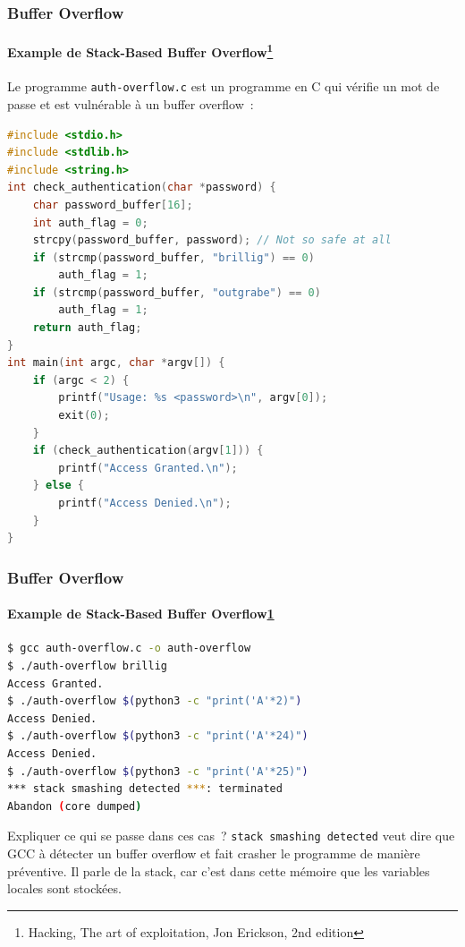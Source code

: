 \documentclass{beamer}
\begin{document}
    \begin{frame}[fragile]
        \frametitle{Buffer Overflow}
        \framesubtitle{Example de Stack-Based Buffer Overflow\footnote{\label{hacking}Hacking, The art of exploitation, Jon Erickson, 2nd edition}}
        \transdissolve
        Le programme \lstinline{auth-overflow.c} est un programme en C qui vérifie un mot de passe et est vulnérable à un buffer overflow~:
        \begin{lstlisting}[language=C,basicstyle=\tiny\ttfamily]
#include <stdio.h>
#include <stdlib.h>
#include <string.h>
int check_authentication(char *password) {
    char password_buffer[16];
    int auth_flag = 0;
    strcpy(password_buffer, password); // Not so safe at all
    if (strcmp(password_buffer, "brillig") == 0)
        auth_flag = 1;
    if (strcmp(password_buffer, "outgrabe") == 0)
        auth_flag = 1;
    return auth_flag;
}
int main(int argc, char *argv[]) {
    if (argc < 2) {
        printf("Usage: %s <password>\n", argv[0]);
        exit(0);
    }
    if (check_authentication(argv[1])) {
        printf("Access Granted.\n");
    } else {
        printf("Access Denied.\n");
    }
}
        \end{lstlisting}
    \end{frame}

    \begin{frame}[fragile]
        \frametitle{Buffer Overflow}
        \framesubtitle{Example de Stack-Based Buffer Overflow\cref{hacking}}
        \transdissolve
        \begin{lstlisting}[language=bash]
$ gcc auth-overflow.c -o auth-overflow
$ ./auth-overflow brillig
Access Granted.
$ ./auth-overflow $(python3 -c "print('A'*2)")
Access Denied.
$ ./auth-overflow $(python3 -c "print('A'*24)")
Access Denied.
$ ./auth-overflow $(python3 -c "print('A'*25)")
*** stack smashing detected ***: terminated
Abandon (core dumped)
        \end{lstlisting}
        Expliquer ce qui se passe dans ces cas~?
        \pause
        \bigbreak
        \lstinline{stack smashing detected} veut dire que GCC à détecter un buffer overflow et fait crasher le programme de manière préventive.
        Il parle de la stack, car c'est dans cette mémoire que les variables locales sont stockées.
    \end{frame}
\end{document}

